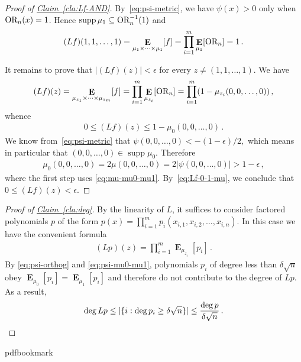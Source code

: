 \documentclass[10pt]{article}
\theoremstyle{definition}
\numberwithin{equation}{section}
\newcommand{\expref}[2]{\texorpdfstring{\hyperref[#2]{#1~\ref{#2}}}{#1~\ref{#2}}}
\newcommand{\OR}      {\text{\rm OR}}
\DeclareMathOperator*{\Exp}{\mathbf{E}}
\DeclareMathOperator{\supp}{supp}
\newcommand{\1}{\mathbf{1}}
\begin{document}
\begin{proof}[Proof of \expref{Claim}{cla:Lf-AND}]
By~\eqref{eq:psi-metric}, we have $\psi(x)>0$ only when $\OR_n(x)=1$.
Hence $\supp\mu_1\subseteq\OR_n^{-1}(1)$ and
\begin{align*}
(Lf)(1,1,\dots,1)
   =\Exp_{\mu_1\times\cdots\times\mu_1}[f]
   =\prod_{i=1}^m\Exp_{\mu_1}[\OR_n]=1\,.
\end{align*}
 
 
It remains to prove that $|(Lf)(z)|<\epsilon$ for every $z\ne(1,1,\dots,1)$.
We have
\begin{align*}
(Lf)(z)
  =\Exp_{\mu_{z_1}\times\cdots\times\mu_{z_m}}[f]
  =\prod_{i=1}^m\Exp_{\mu_{z_i}}[\OR_n]
  =\prod_{i=1}^m(1-\mu_{z_i}(0,0,\dots,0))\,,
\end{align*}
whence
\begin{align}
0\leq(Lf)(z)\leq1-\mu_0(0,0,\dots,0)\,.\label{eq:Lf-0-1-mu}
\end{align}
We know from~\eqref{eq:psi-metric} that $\psi(0,0,\dots,0)<-(1-\epsilon)/2,$
which means in particular that $(0,0,\dots,0)\in\supp\mu_0$. Therefore
\begin{align*}
\mu_0(0,0,\dots,0)
  =2\mu(0,0,\dots,0)
  =2|\psi(0,0,\dots,0)|
  >1-\epsilon\,,
\end{align*}
where the first step uses \eqref{eq:mu-mu0-mu1}. By~\eqref{eq:Lf-0-1-mu},
we conclude that $0\leq(Lf)(z)<\epsilon$.
\end{proof}
 
\begin{proof}[Proof of \expref{Claim}{cla:deg}]
By the linearity of $L$, it suffices to consider factored polynomials
$p$ of the form $p(x)=\prod_{i=1}^mp_i(x_{i,1},x_{i,2},\dots,x_{i,n})$.
In this case we have the convenient formula
\begin{align*}
(Lp)(z)=\prod_{i=1}^m\Exp_{\mu_{z_i}}[p_i]\,.
\end{align*}
By \eqref{eq:psi-orthog} and \eqref{eq:psi-mu0-mu1}, polynomials
$p_i$ of degree less than $\delta\sqrt{n}$ obey 
$\Exp_{\mu_0}[p_i]=\Exp_{\mu_1}[p_i]$
and therefore do not contribute to the degree of $Lp$. As a result,
\[
\deg Lp\leq|\{i:\deg p_i\geq\delta\sqrt{n}\}|
   \leq\frac{\deg p}{\delta\sqrt{n}}\,.\qedhere
\]
\end{proof}
\clearpage
\begingroup\raggedright
%
%
%
%
%
\providecommand{\bibhead}[1]{}
%
\expandafter\ifx\csname pdfbookmark\endcsname\relax%
  \providecommand{\tocrefpdfbookmark}{}
\else\providecommand{\tocrefpdfbookmark}{%
   \hypertarget{tocreferences}{}%
   \pdfbookmark[1]{References}{tocreferences}}%
\fi
\end{document}
